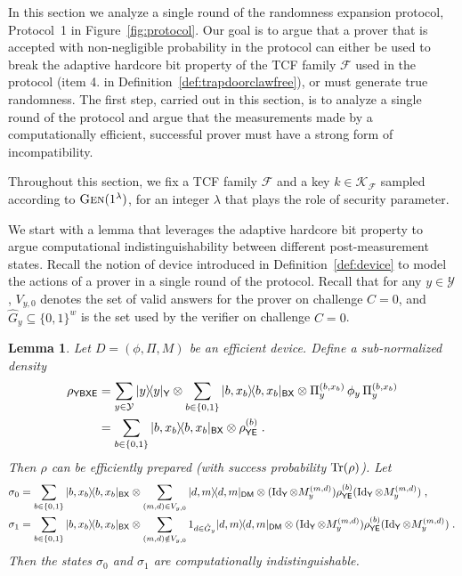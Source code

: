 \documentclass[11pt]{article}
\newtheorem{lemma}[theorem]{Lemma}
\theoremstyle{remark}
\theoremstyle{definition}
\newcommand{\ket}[1]{|#1\rangle}
\newcommand{\bra}[1]{\langle#1|}
\newcommand{\proj}[1]{\ket{#1}\!\bra{#1}}
\newcommand{\Tr}{\mbox{\rm Tr}}
\newcommand{\Id}{\ensuremath{\mathop{\rm Id}\nolimits}}
\newcommand{\reg}[1]{{\textsf{#1}}}
\newcommand{\mF}{\ensuremath{\mathcal{F}}}
\newcommand{\mK}{\ensuremath{\mathcal{K}}}
\newcommand{\mY}{\ensuremath{\mathcal{Y}}}
\newcommand{\dset}{G}
\newcommand{\Gen}{\textsc{Gen}}
\begin{document}
In this section we analyze a single round of the randomness expansion protocol, Protocol~1 in Figure~\ref{fig:protocol}. Our goal is to argue that a prover that is accepted with non-negligible probability in the protocol can either be used to break the adaptive hardcore bit property of the TCF family $\mathcal{F}$ used in the protocol (item 4. in Definition~\ref{def:trapdoorclawfree}), or must generate true randomness. The first step, carried out in this section, is to analyze a single round of the protocol and argue that the measurements made by a computationally efficient, successful prover must have a strong form of incompatibility.

Throughout this section, we fix a TCF family $\mathcal{F}$ and a key $k\in \mK_\mF$ sampled according to $\Gen(1^\lambda)$, for an integer $\lambda$ that plays the role of security parameter. 

We start with a lemma that leverages the adaptive hardcore bit property to argue computational indistinguishability between different post-measurement states. Recall the notion of device introduced in Definition~\ref{def:device} to model the actions of a prover in a single round of the protocol. 
Recall that for any $y\in\mY$, $V_{y,0}$ denotes the set of valid answers for the prover on challenge $C=0$, and $\hat{\dset}_y\subseteq\{0,1\}^w$ is the set used by the verifier on challenge $C=0$. 

\begin{lemma} \label{lem:break}
Let $D = (\phi,\Pi,M)$ be an efficient device. Define a sub-normalized density 
\begin{align}
\rho_{\reg{YBXE}} &= \sum_{y\in\mY} \proj{y}_\reg{Y}\otimes \sum_{b\in\{0,1\}} \proj{b,x_b}_\reg{BX} \otimes \Pi_y^{(b,x_b)} \,\phi_y \,\Pi_y^{(b,x_b)}\notag\\
&=  \sum_{b\in\{0,1\}} \proj{b,x_b}_\reg{BX} \otimes \rho^{(b)}_\reg{YE}\;.\label{eq:def-sigmay}
\end{align}
Then $\rho$ can be efficiently prepared (with success probability $\Tr(\rho)$). Let
\begin{align}
\sigma_0 &=\sum_{b\in\{0,1\}} \proj{b,x_b}_{\reg{BX}} \otimes  \sum_{(m,d) \in {V}_{y,0}} \proj{d,m}_{\reg{DM}}\otimes (\Id_\reg{Y}\otimes M_y^{(m,d)}) \rho^{(b)}_{\reg{YE}} (\Id_\reg{Y}\otimes M_y^{(m,d)})\;,\notag\\
 \sigma_1 &=\sum_{b\in\{0,1\}} \proj{b,x_b}_{\reg{BX}} \otimes  \sum_{(m,d)\notin V_{y,0}} 1_{d\in \hat{\dset}_{y} } \proj{d,m}_{\reg{DM}}\otimes (\Id_\reg{Y}\otimes M_y^{(m,d)}) \rho^{(b)}_{\reg{YE}} (\Id_\reg{Y}\otimes M_y^{(m,d)})\;.\label{eq:def-rho}
\end{align}
Then the states $\sigma_0$ and $\sigma_1$ are computationally indistinguishable. 
\end{lemma}
\end{document}

